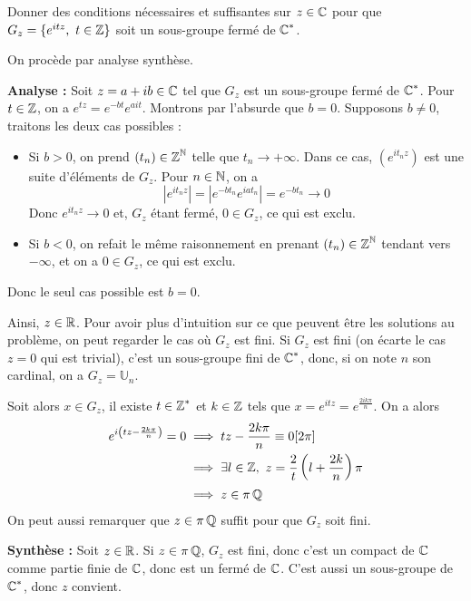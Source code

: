 \begin{exo}
    \label{evn1}
    Donner des conditions nécessaires et suffisantes 
    sur $z\in\operatorname{\mathbb C}$ pour que $G_z=\lbrace e^{itz},\ t\in\Z\rbrace$
    soit un sous-groupe fermé de $\operatorname{\mathbb C}^*$.
\end{exo}

\begin{solution}
    On procède par analyse synthèse.


    \textbf{Analyse :} Soit $z=a+ib\in\operatorname{\mathbb C}$ tel que $G_z$ est un sous-groupe fermé de $\operatorname{\mathbb C}^*$.
    Pour $t\in\operatorname{\mathbb Z}$, on a $e^{tz}=e^{-bt}e^{ait}$. 
    Montrons par l'absurde que $b=0$.
    Supposons $b\neq 0$, traitons les deux cas possibles : 
    \begin{itemize}
        \item Si $b > 0$, on prend $(t_n)\in\operatorname{\mathbb Z}^{\operatorname{\mathbb N}}$ telle que $t_n\longrightarrow +\infty$. 
        Dans ce cas, $(e^{it_nz})$ est une suite d'éléments de $G_z$. 
        Pour $n\in\operatorname{\mathbb N}$, on a \[|e^{it_nz}|=|e^{-bt_n}e^{iat_n}|=e^{-bt_n}\longrightarrow 0\]
        Donc $e^{it_nz}\longrightarrow 0$ et, $G_z$ étant fermé, $0\in G_z$, ce qui est exclu.
        \item Si $b < 0$, on refait le même raisonnement en prenant $(t_n)\in\operatorname{\mathbb Z}^{\operatorname{\mathbb N}}$ tendant vers $-\infty$, et on a $0\in G_z$, ce qui est exclu.
    \end{itemize}
    Donc le seul cas possible est $b=0$.


    Ainsi, $z\in\operatorname{\mathbb R}$. 
    Pour avoir plus d'intuition sur ce que peuvent être les solutions au problème, on peut regarder le cas où $G_z$ est fini.
    Si $G_z$ est fini (on écarte le cas $z=0$ qui est trivial), c'est un sous-groupe fini de $\operatorname{\mathbb C}^*$, donc, si on note $n$ son cardinal, on a $G_z=\mathbb U_n$.

    Soit alors $x\in G_z$, il existe $t\in\operatorname{\mathbb Z}^*$ et $k\in\operatorname{\mathbb Z}$ tels que $x=e^{itz}=e^{\frac{2ik\pi}n}$. On a alors 
    \begin{align*}
        e^{i\left(tz-\frac{2k\pi}n\right)} = 0 &\implies tz - \frac{2k\pi}n\equiv 0[2\pi]\\
                                            &\implies \exists l\in\operatorname{\mathbb Z},\ z=\frac2t\left(l+\frac{2k}n\right)\pi\\
                                            &\implies z\in\pi\operatorname{\mathbb Q}
    \end{align*}
    On peut aussi remarquer que $z\in\pi\operatorname{\mathbb Q}$ suffit pour que $G_z$ soit fini. 


    \textbf{Synthèse :} Soit $z\in\operatorname{\mathbb R}$.
    Si $z\in\pi\operatorname{\mathbb Q}$, $G_z$ est fini, donc c'est un compact de $\operatorname{\mathbb C}$ comme partie finie de $\operatorname{\mathbb C}$,
    donc est un fermé de $\operatorname{\mathbb C}$. C'est aussi un sous-groupe de $\operatorname{\mathbb C}^*$, donc $z$ convient.



\end{solution}
